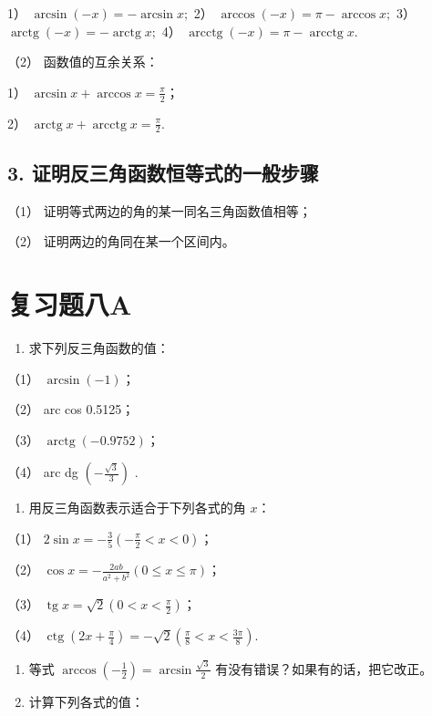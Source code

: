 1） \(\arcsin (-x) = -\arcsin x;\) 2）
\(\arccos (-x) = \pi -\arccos x;\) 3）
\(\operatorname{arctg}(-x) = -\operatorname{arctg} x;\) 4）
\(\operatorname{arcctg}(-x) = \pi - \operatorname{arcctg} x.\)

（2） 函数值的互余关系：

1） \(\arcsin x + \arccos x = \frac{\pi}{2}\)；

2）
\(\operatorname{arctg} x + \operatorname{arcctg} x = \frac{\pi}{2}\).

\subsection{3. 证明反三角函数恒等式的一般步骤}

（1） 证明等式两边的角的某一同名三角函数值相等；

（2） 证明两边的角同在某一个区间内。

\section{复习题八A}

\begin{enumerate}
\item
  求下列反三角函数的值：
\end{enumerate}

（1） \(\arcsin (-1)\)；

（2） arc cos 0.5125；

（3） \(\operatorname{arctg}(-0.9752)\)；

（4） arc dg \(\left(-\frac{\sqrt{3}}{3}\right)\) .

\begin{enumerate}[start=2]
\item
  用反三角函数表示适合于下列各式的角 \(x\)：
\end{enumerate}

（1） \(2\sin x = -\frac{3}{5}\left(-\frac{\pi}{2} < x < 0\right)\)；

（2）
\(\cos x = -\frac{2ab}{a^2 + b^2} (0 \leqslant x \leqslant \pi)\)；

（3）
\(\operatorname{tg} x = \sqrt{2}\left(0 < x < \frac{\pi}{2}\right)\)；

（4）
\(\operatorname{ctg}\left(2x + \frac{\pi}{4}\right) = -\sqrt{2}\left(\frac{\pi}{8} < x < \frac{3\pi}{8}\right)\).

\begin{enumerate}[start=3]
\item
  等式 \(\arccos\left(-\frac{1}{2}\right)=\arcsin\frac{\sqrt{3}}{2}\)
  有没有错误？如果有的话，把它改正。
\item
  计算下列各式的值：
\end{enumerate}

